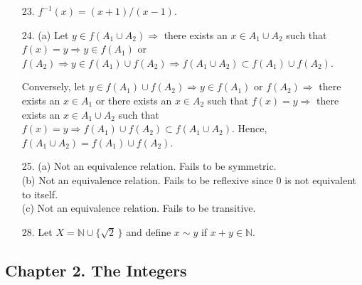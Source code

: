 {\begin{itemize}
\item[23.]
$f^{-1}(x) = (x+1)/(x-1)$.
 
\item[24.]
(a)  Let $y \in f(A_1 \cup A_2) \Rightarrow$ there exists an $x
\in A_1 \cup A_2$ such that $f(x) = y \Rightarrow y \in f(A_1)$ or
$f(A_2) \Rightarrow y \in f(A_1) \cup f(A_2) \Rightarrow f(A_1 \cup A_2)
\subset f(A_1) \cup f(A_2)$.
 
Conversely, let $y \in f(A_1) \cup f(A_2) \Rightarrow y \in f(A_1)$ or
$f(A_2) \Rightarrow$ there exists an $x \in A_1$ or there exists an
$x \in A_2$ such that $f(x) = y \Rightarrow$ there exists an $x \in
A_1 \cup A_2$ such that $f(x) = y \Rightarrow f(A_1) \cup f(A_2)
\subset f(A_1 \cup A_2)$. Hence, $f(A_1 \cup A_2) = f(A_1) \cup f(A_2)$. 
 
\item[25.]
(a) Not an equivalence relation. Fails to be symmetric.\\
(b) Not an equivalence relation. Fails to be reflexive since 0 is not equivalent to itself.\\
(c) Not an equivalence relation. Fails to be transitive.



 
\item[28.]
Let $X = {\mathbb N} \cup \{ \sqrt{2}\, \}$ and define $x \sim y$ if $x + y
\in {\mathbb N}$.
 
\end{itemize}
}
 
 
 
\subsection*{Chapter 2. The Integers}
 

